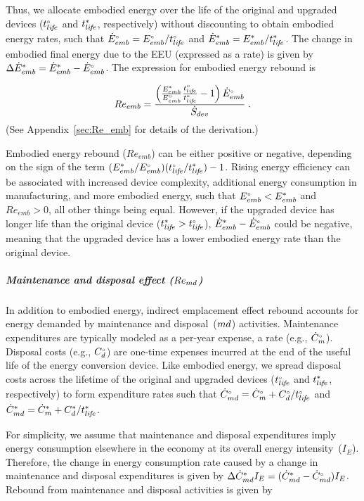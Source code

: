 \documentclass[12pt]{article}\usepackage[]{graphicx}\usepackage[]{xcolor}
\begin{document}
Thus, we allocate embodied energy over the life of the original and upgraded devices
(${}{t}^{\scriptscriptstyle \circ}_{li\!f\!e}$ and ${t}^*_{li\!f\!e}$, respectively)
without discounting
to obtain embodied energy rates, such that
${}{\dot{E}}^{\scriptscriptstyle \circ}_{emb} = {}{E}^{\scriptscriptstyle \circ}_{emb} / {}{t}^{\scriptscriptstyle \circ}_{li\!f\!e}$
and 
${\dot{E}}^*_{emb} = {E}^*_{emb} / {t}^*_{li\!f\!e}$.
The change in embodied final energy due to the EEU (expressed as a rate) is given by
$\Delta {\dot{E}}^*_{emb} = {\dot{E}}^*_{emb} - {}{\dot{E}}^{\scriptscriptstyle \circ}_{emb}$.
The expression for embodied energy rebound is

\begin{equation} \label{eq:Re_emb}
  Re_{emb} = \frac{\left( \frac{{E}^*_{emb}}{{}{E}^{\scriptscriptstyle \circ}_{emb}} \frac{{}{t}^{\scriptscriptstyle \circ}_{li\!f\!e}}{{t}^*_{li\!f\!e}} - 1 \right) {}{\dot{E}}^{\scriptscriptstyle \circ}_{emb}}{\dot{S}_{dev}}{} \; .
\end{equation}
%
(See Appendix~\ref{sec:Re_emb} for details of the derivation.)

Embodied energy rebound ($Re_{emb}$)
can be either positive or negative, depending on 
the sign of the term
$({E}^*_{emb}/{}{E}^{\scriptscriptstyle \circ}_{emb})({}{t}^{\scriptscriptstyle \circ}_{li\!f\!e}/{t}^*_{li\!f\!e}) - 1$.
Rising energy efficiency can be associated with increased device complexity,
additional energy consumption in manufacturing, and
more embodied energy,
such that ${}{E}^{\scriptscriptstyle \circ}_{emb} < {E}^*_{emb}$ and $Re_{emb} > 0$,
all other things being equal.
However, if the upgraded device has longer life than the original device
(${t}^*_{li\!f\!e} > {}{t}^{\scriptscriptstyle \circ}_{li\!f\!e}$),
${\dot{E}}^*_{emb} - {}{\dot{E}}^{\scriptscriptstyle \circ}_{emb}$ could be negative,
meaning that the upgraded device has a lower embodied energy rate than the original device.


\subparagraph{Maintenance and disposal effect ($Re_{md}$)} 

In addition to embodied energy, 
indirect emplacement effect rebound accounts for
energy demanded by maintenance and disposal~($md$) activities.
Maintenance expenditures are typically modeled as a per-year expense, a rate (e.g., ${}{\dot{C}}^{\scriptscriptstyle \circ}_m$).
Disposal costs (e.g., ${}{C}^{\scriptscriptstyle \circ}_d$) are one-time expenses incurred 
at the end of the useful life of the energy conversion device.
Like embodied energy, we spread disposal costs across the lifetime 
of the original and upgraded devices (${}{t}^{\scriptscriptstyle \circ}_{li\!f\!e}$ and ${t}^*_{li\!f\!e}$, respectively)
to form expenditure rates such that 
${}{\dot{C}}^{\scriptscriptstyle \circ}_{md} = {}{\dot{C}}^{\scriptscriptstyle \circ}_m + {}{C}^{\scriptscriptstyle \circ}_d/{}{t}^{\scriptscriptstyle \circ}_{li\!f\!e}$
and
${\dot{C}}^*_{md} = {\dot{C}}^*_m + {C}^*_d/{t}^*_{li\!f\!e}$.

For simplicity, we assume that maintenance and disposal
expenditures imply energy consumption
elsewhere in the economy at its overall energy intensity~($I_E$).
Therefore, the change in energy consumption rate caused by a change 
in maintenance and disposal expenditures
is given by $\Delta {\dot{C}}^*_{md} I_E = ({\dot{C}}^*_{md} - {}{\dot{C}}^{\scriptscriptstyle \circ}_{md}) I_E$.
Rebound from maintenance and disposal activities 
is given by 
\end{document}
